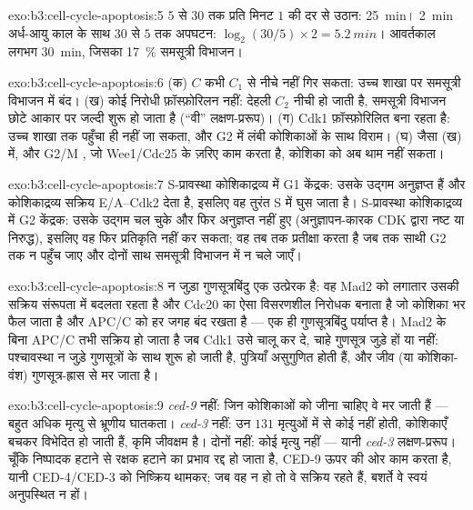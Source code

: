 \begin{solution}{exo:b3:cell-cycle-apoptosis:5}
$5$ से $30$ तक प्रति मिनट $1$ की दर से उठान: \qty{25}{min}।
\qty{2}{min} अर्ध-आयु काल के साथ $30$ से $5$ तक अपघटन: $\log_{2}(30/5)\times 2 =
\qty{5.2}{min}$। आवर्तकाल लगभग \qty{30}{min}, जिसका \qty{17}{\%} समसूत्री विभाजन।
\end{solution}

\begin{solution}{exo:b3:cell-cycle-apoptosis:6}
(क) $C$ कभी $C_{1}$ से नीचे नहीं गिर सकता: उच्च शाखा पर समसूत्री
विभाजन में बंद। (ख) कोई निरोधी फ़ॉस्फ़ोरिलन नहीं: देहली $C_{2}$ नीची हो
जाती है, समसूत्री विभाजन छोटे आकार पर जल्दी शुरू हो जाता है (``वी''
लक्षण-प्ररूप)। (ग) Cdk1 फ़ॉस्फ़ोरिलित बना रहता है: उच्च शाखा तक पहुँचा
ही नहीं जा सकता, और G2 में लंबी कोशिकाओं के साथ विराम। (घ) जैसा (ख)
में, और G2/M , जो Wee1/Cdc25 के ज़रिए काम करता है, कोशिका को
अब थाम नहीं सकता।
\end{solution}

\begin{solution}{exo:b3:cell-cycle-apoptosis:7}
S-प्रावस्था कोशिकाद्रव्य में G1 केंद्रक: उसके उद्गम अनुज्ञप्त हैं और
कोशिकाद्रव्य सक्रिय  E/A--Cdk2 देता है, इसलिए वह तुरंत S में घुस
जाता है। S-प्रावस्था कोशिकाद्रव्य में G2 केंद्रक: उसके उद्गम चल चुके
और फिर अनुज्ञप्त नहीं हुए (अनुज्ञापन-कारक CDK द्वारा नष्ट या निरुद्ध),
इसलिए वह फिर प्रतिकृति नहीं कर सकता; वह तब तक प्रतीक्षा करता है जब तक
साथी G2 तक न पहुँच जाए और दोनों साथ समसूत्री विभाजन में न चले जाएँ।
\end{solution}

\begin{solution}{exo:b3:cell-cycle-apoptosis:8}
न जुड़ा गुणसूत्रबिंदु एक उत्प्रेरक है: वह Mad2 को लगातार उसकी सक्रिय
संरूपता में बदलता रहता है और Cdc20 का ऐसा विसरणशील निरोधक बनाता है जो
कोशिका भर फैल जाता है और APC/C को हर जगह बंद रखता है --- एक ही
गुणसूत्रबिंदु पर्याप्त है। Mad2 के बिना APC/C तभी सक्रिय हो जाता है जब
Cdk1 उसे चालू कर दे, चाहे गुणसूत्र जुड़े हों या नहीं: पश्चावस्था न जुड़े
गुणसूत्रों के साथ शुरू हो जाती है, पुत्रियाँ असुगुणित होती हैं, और जीव
(या कोशिका-वंश) गुणसूत्र-ह्रास से मर जाता है।
\end{solution}

\begin{solution}{exo:b3:cell-cycle-apoptosis:9}
\emph{ced-9} नहीं: जिन कोशिकाओं को जीना चाहिए वे मर जाती हैं ---
बहुत अधिक मृत्यु से भ्रूणीय घातकता। \emph{ced-3} नहीं: उन $131$
मृत्युओं में से कोई नहीं होती, कोशिकाएँ बचकर विभेदित हो जाती हैं, कृमि
जीवक्षम है। दोनों नहीं: कोई मृत्यु नहीं --- यानी \emph{ced-3}
लक्षण-प्ररूप। चूँकि निष्पादक हटाने से रक्षक हटाने का प्रभाव रद्द हो
जाता है, CED-9 ऊपर की ओर काम करता है, यानी CED-4/CED-3 को निष्क्रिय
थामकर; जब वह न हो तो वे सक्रिय रहते हैं, बशर्ते वे स्वयं अनुपस्थित न हों।
\end{solution}

